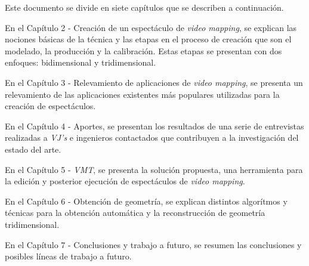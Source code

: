 Este documento se divide en siete capítulos que se describen a continuación.

En el Capítulo 2 - Creación de un espectáculo de \emph{video mapping}, se explican las nociones básicas de la técnica y las etapas en el proceso de creación que son el modelado, la producción y la calibración. Estas etapas se presentan con dos enfoques: bidimensional y tridimensional.

En el Capítulo 3 - Relevamiento de aplicaciones de \emph{video mapping}, se presenta un relevamiento de las aplicaciones existentes más populares utilizadas para la creación de espectáculos.

En el Capítulo 4 - Aportes, se presentan los resultados de una serie de entrevistas realizadas a \emph{VJ’s} e ingenieros contactados que contribuyen a la investigación del estado del arte.

En el Capítulo 5 - \emph{VMT}, se presenta la solución propuesta, una herramienta para la edición y posterior ejecución de espectáculos de \emph{video mapping}.

En el Capítulo 6 - Obtención de geometría, se explican distintos algorítmos y técnicas para la obtención automática y la reconstrucción de geometría tridimensional.

En el Capítulo 7 - Conclusiones y trabajo a futuro, se resumen las conclusiones y posibles líneas de trabajo a futuro.
